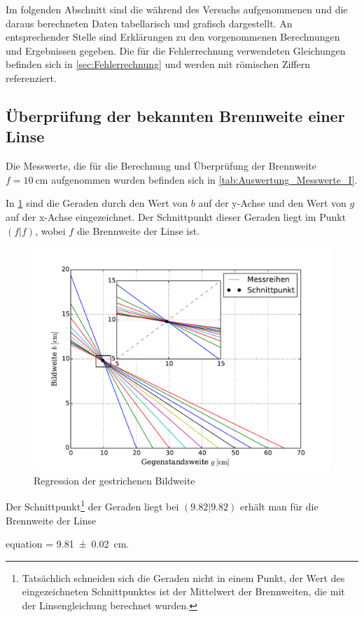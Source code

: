 Im folgenden Abschnitt sind die während des Versuchs aufgenommenen 
und die daraus berechneten Daten tabellarisch und grafisch dargestellt.
An entsprechender Stelle sind Erklärungen zu den vorgenommenen Berechnungen 
und Ergebnissen gegeben. Die für die Fehlerrechnung verwendeten Gleichungen
befinden sich in \cref{sec:Fehlerrechnung} und werden mit römischen Ziffern
referenziert.

\subsection{Überprüfung der bekannten Brennweite einer Linse}

	Die Messwerte, die für die Berechnung und Überprüfung der Brennweite $f=\SI{10}{\centi\meter}$ aufgenommen wurden 
	befinden sich in \cref{tab:Auswertung_Messwerte_I}.
	
	  			
	
	In \cref{fig:Auswertung_BekannteLinse} sind die Geraden durch den Wert von $b$ auf der y-Achse und den Wert von $g$
	auf der x-Achse eingezeichnet. Der Schnittpunkt dieser Geraden liegt im Punkt $(f|f)$, wobei $f$
	die Brennweite der Linse ist.
	  
	\begin{figure}[!h]
		\centering
		\includegraphics[scale=.7]{Grafiken/Messwerte_Bekannt.pdf}
		\caption{Regression der gestrichenen Bildweite\label{fig:Auswertung_BekannteLinse}}
	\end{figure}  
	 
	 Der Schnittpunkt\footnote{Tatsächlich schneiden sich die Geraden nicht in einem Punkt, der Wert
	 des eingezeichneten Schnittpunktes ist der Mittelwert der Brennweiten, die mit der Linsengleichung berechnet
	 wurden.} der Geraden liegt bei $(9.82|9.82)$ erhält man für die Brennweite der Linse
	 \begin{empheq}{equation}
		\label{val:Auswertung_Bekannt}
		 = \SI{9.81(2)}{\centi\meter}.
	 \end{empheq}
	  
